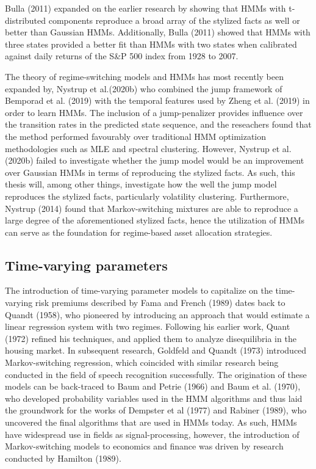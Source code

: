 Bulla (2011) expanded on the earlier research by showing that HMMs with t-distributed components reproduce a broad array of the stylized facts as well or better than Gaussian HMMs. Additionally, Bulla (2011) showed that HMMs with three states provided a better fit than HMMs with two states when calibrated against daily returns of the S\&P 500 index from 1928 to 2007. 

The theory of regime-switching models and HMMs has most recently been expanded by, Nystrup et al.(2020b) who combined the jump framework of Bemporad et al. (2019) with the temporal features used by Zheng et al. (2019) in order to learn HMMs. The inclusion of a jump-penalizer provides influence over the transition rates in the predicted state sequence, and the reseachers found that the method performed favourably over traditional HMM optimization methodologies such as MLE and spectral clustering. However, Nystrup et al. (2020b) failed to investigate whether the jump model would be an improvement over Gaussian HMMs in terms of reproducing the stylized facts. As such, this thesis will, among other things, investigate how the well the jump model reproduces the stylized facts, particularly volatility clustering. Furthermore, Nystrup (2014) found that Markov-switching mixtures are able to reproduce a large degree of the aforementioned stylized facts, hence the utilization of HMMs can serve as the foundation for regime-based asset allocation strategies. 


\subsection{Time-varying parameters}
The introduction of time-varying parameter models to capitalize on the time-varying risk premiums described
by Fama and French (1989) dates back to Quandt (1958), who pioneered by introducing an approach that would estimate a linear regression system with two regimes. Following his earlier work, Quant (1972) refined his techniques, and applied them to analyze disequilibria in the housing market. In subsequent research, Goldfeld and Quandt (1973) introduced Markov-switching regression, which coincided with similar research being conducted in the field of speech recognition successfully. The origination of these models can be back-traced to Baum and Petrie (1966) and Baum et al. (1970), who developed probability variables used in the HMM algorithms and thus laid the groundwork for the works of Dempster et al (1977) and Rabiner (1989), who uncovered the final algorithms that are used in HMMs today. As such, HMMs have widespread use in fields as signal-processing, however, the introduction of Markov-switching models to economics and finance was driven by research conducted by Hamilton (1989).

